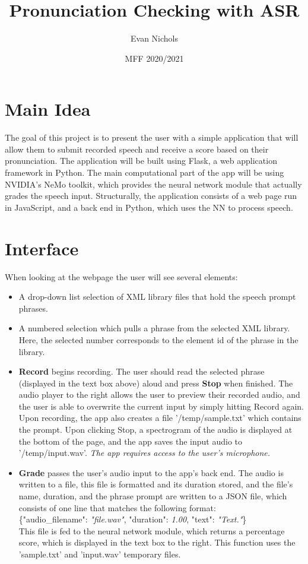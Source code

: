\documentclass[12pt, letterpaper]{article}
\title{Pronunciation Checking with ASR}
\author{Evan Nichols}
\date{MFF 2020/2021}
\begin{document}
\maketitle

\section*{Main Idea}
The goal of this project is to present the user with a simple application that will allow them to submit recorded speech and receive a score based on their pronunciation. The application will be built using Flask, a web application framework in Python. The main computational part of the app will be using NVIDIA's NeMo toolkit, which provides the neural network module that actually grades the speech input. Structurally, the application consists of a web page run in JavaScript, and a back end in Python, which uses the NN to process speech. 

\section*{Interface}
When looking at the webpage the user will see several elements:
\begin{itemize}
\item A drop-down list selection of XML library files that hold the speech prompt phrases.

\item A numbered selection which pulls a phrase from the selected XML library. Here, the selected number corresponds to the element id of the phrase in the library.

\item \textbf{Record} begins recording. The user should read the selected phrase (displayed in the text box above) aloud and press \textbf{Stop} when finished. The audio player to the right allows the user to preview their recorded audio, and the user is able to overwrite the current input by simply hitting Record again. Upon recording, the app also creates a file '/temp/sample.txt' which contains the prompt.
Upon clicking Stop, a spectrogram of the audio is displayed at the bottom of the page, and the app saves the input audio to '/temp/input.wav'. 
\textit{The app requires access to the user's microphone.}

\item \textbf{Grade} passes the user's audio input to the app's back end. The audio is written to a file, this file is formatted and its duration stored, and the file's name, duration, and the phrase prompt are written to a JSON file, which consists of one line that matches the following format: \\
\hspace*{19mm} \{"audio\_filename": \textit{"file.wav"}, "duration": \textit{1.00}, "text": \textit{"Text."}\} \\
This file is fed to the neural network module, which returns a percentage score, which is displayed in the text box to the right. This function uses the 'sample.txt' and 'input.wav' temporary files.
\end{itemize}
\newpage%
\end{document}
